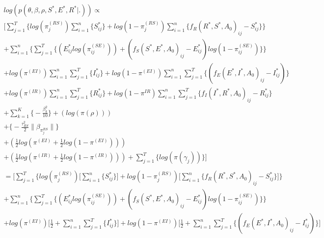 \documentclass[12pt]{article}
\begin{document}
\begin{center}
\begin{multline}
\displaystyle
log(p(\theta,\beta,\rho,S^*,E^*,R^*|.)) \propto\\ \Bigg[ 
            \sum_{j=1}^T\Big\{log(\pi_j^{(RS)})\sum_{i=1}^n\{S^*_{ij}\} + 
            log(1-\pi_j^{(RS)})\sum_{i=1}^n\{f_R(R^*, S^*, A_0)_{ij} - S^*_{ij}\}\Big\} \\ 
            +\sum_{i=1}^n \bigg\{ \sum_{j=1}^T\Big\{
            (E^*_{ij}log(\pi_{ij}^{(SE)})) + (f_S(S^*, E^*, A_0)_{ij} - E^*_{ij})log(1-\pi_{ij}^{(SE)})\Big\}\bigg\} \\
            + log(\pi^{(EI)})\sum_{i=1}^n\sum_{j=1}^T\{I^*_{ij}\} 
            + log(1-\pi^{(EI)})\sum_{i=1}^n\sum_{j=1}^T\{(f_E(E^*, I^*, A_0)_{ij} - I^*_{ij})\}\\
            + log(\pi^{(IR)})\sum_{i=1}^n\sum_{j=1}^T\{R^*_{ij}\} + 
            log(1-\pi^{IR})\sum_{i=1}^n\sum_{j=1}^T\{ f_I(I^*, R^*, A_0)_{ij} - R^*_{ij}\}\\
            + \sum_{k = 1}^K\bigg\{-\frac{\beta^2_k}{10}\bigg\}
            + (log(\pi(\rho)))\\
            + \bigg\{ -\frac{\tau^2_{RS}}{2}\|\beta_{\pi_j^{RS}}\|  \bigg\} \\ 
            + (\frac{1}{2}log(\pi^{(EI)} + \frac{1}{2}log(1-\pi^{(EI)}))) \\
            + (\frac{1}{2}log(\pi^{(IR)} + \frac{1}{2}log(1-\pi^{(IR)})))   
            + \sum_{j=1}^{T} \bigg\{ log(\pi(\gamma_j)) \bigg\}\Bigg]\\
\end{multline}
\begin{multline}
\displaystyle
= \Bigg[ 
    \sum_{j=1}^T\Big\{log(\pi_j^{(RS)})\Big[\sum_{i=1}^n\{S^*_{ij}\}\Big] + 
            log(1-\pi_j^{(RS)})\Big[\sum_{i=1}^n\{f_R(R^*, S^*, A_0)_{ij} - S^*_{ij}\}\Big]\Big\}\\ 
            +\sum_{i=1}^n \bigg\{ \sum_{j=1}^T\Big\{
            (E^*_{ij}log(\pi_{ij}^{(SE)})) + (f_S(S^*, E^*, A_0)_{ij} - E^*_{ij})log(1-\pi_{ij}^{(SE)})\Big\}\bigg\} \\
            + log(\pi^{(EI)})\Big[\frac{1}{2} + \sum_{i=1}^n\sum_{j=1}^T\{I^*_{ij}\}\Big] 
            + log(1-\pi^{(EI)})\Big[\frac{1}{2} + \sum_{i=1}^n\sum_{j=1}^T\{(f_E(E^*, I^*, A_0)_{ij} - I^*_{ij})\}\Big]\\

\end{multline}
\end{center}
\end{document}
